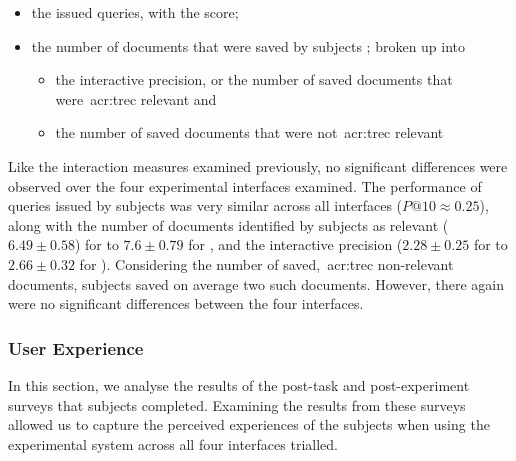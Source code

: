 \begin{itemize}
    \item{the issued queries, with the  score;}
    \item{the number of documents that were saved by subjects ; broken up into}
    
    \begin{itemize}
        \item{the interactive precision, or the number of saved documents that were~\gls{acr:trec} relevant  and}
        \item{the number of saved documents that were not~\gls{acr:trec} relevant }
    \end{itemize}
\end{itemize}

Like the interaction measures examined previously, no significant differences were observed over the four experimental interfaces examined. The performance of queries issued by subjects was very similar across all interfaces ($P@10 \approx 0.25$), along with the number of documents identified by subjects as relevant ($6.49\pm0.58$) for  to $7.6\pm0.79$ for , and the interactive precision ($2.28\pm0.25$ for  to $2.66\pm0.32$ for ). Considering the number of saved,~\gls{acr:trec} non-relevant documents, subjects saved on average two such documents. However, there again were no significant differences between the four interfaces.

\subsubsection{User Experience}\label{chap:snippets:user:results:ux}
In this section, we analyse the results of the post-task and post-experiment surveys that subjects completed. Examining the results from these surveys allowed us to capture the perceived experiences of the subjects when using the experimental system across all four interfaces trialled.

